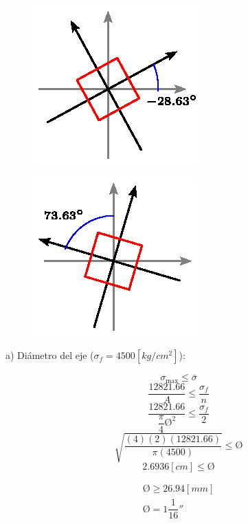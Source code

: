 \documentclass[letter,10pt,twoside]{article}
\begin{document}
\begin{figure}[H]
\centering
\includegraphics[scale=1.6]{resources/f82.eps}
\end{figure}

\begin{figure}[H]
\centering
\includegraphics[scale=1.6]{resources/f83.eps}
\end{figure}

a) Diámetro del eje ($\sigma_f = 4500[kg/cm^2]$):

\begin{equation*}
    \sigma_{\text{max}} \le \bar{\sigma}
\end{equation*}
\begin{equation*}
    \frac{12821.66}{A} \le \frac{\sigma_f}{n}
\end{equation*}
\begin{equation*}
    \frac{12821.66}{\dfrac{\pi}{4} \text{\O}^2} \le \frac{\sigma_f}{2}
\end{equation*}
\begin{equation*}
    \sqrt{\frac{(4)(2)(12821.66)}{\pi(4500)}} \le \text{\O}
\end{equation*}
\begin{equation*}
    2.6936[cm] \le \text{\O}
\end{equation*}

\begin{equation*}
\boxed{
    \begin{array}{l}
        \text{\O} \ge 26.94[mm] \\
        \text{\O} = 1 \dfrac{1}{16}''
    \end{array}
}
\end{equation*}
\end{document}
